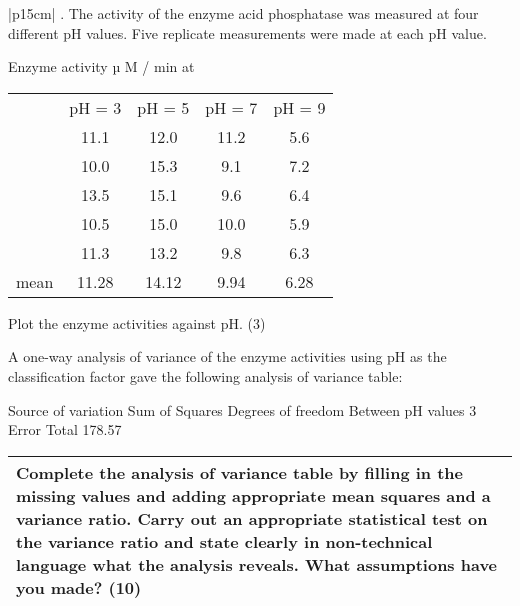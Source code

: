 \documentclass[a4paper,12pt]{article}
\begin{document}
\begin{table}[ht!]
 \centering
 \begin{tabular}{|p{15cm}|}
 . The activity of the enzyme acid phosphatase was measured at four different pH values.  Five replicate measurements were made at each pH value. 
 
 Enzyme activity 
µ M / min at 
\begin{center}
\begin{tabular}{ccccc}
& pH = 3 & pH = 5 & pH = 7 & pH = 9\\  
& 11.1 & 12.0 & 11.2 & 5.6  \\
& 10.0 & 15.3 & 9.1 & 7.2  \\
& 13.5 & 15.1 & 9.6 & 6.4  \\
& 10.5 & 15.0 & 10.0& 5.9  \\
& 11.3 & 13.2 & 9.8 &6.3 \\
mean & 11.28 & 14.12 & 9.94& 6.28 \\
\end{tabular}
\end{center}
 
 Plot the enzyme activities against pH.            (3) 
 
 A one-way analysis of variance of the enzyme activities using pH as the classification factor gave the following analysis of variance table: 
 
Source of variation Sum of Squares Degrees of freedom Between pH values  3 Error   Total 178.57  
\\ \hline
  \end{tabular}
\end{table}
\begin{table}[ht!]
 \centering
 \begin{tabular}{|p{15cm}|}
 \hline  
Complete the analysis of variance table by filling in the missing values and adding appropriate mean squares and a variance ratio.  Carry out an appropriate statistical test on the variance ratio and state clearly in non-technical language what the analysis reveals.  What assumptions have you made?        (10) 
\\ \hline
  \end{tabular}
\end{table}
\end{document}
